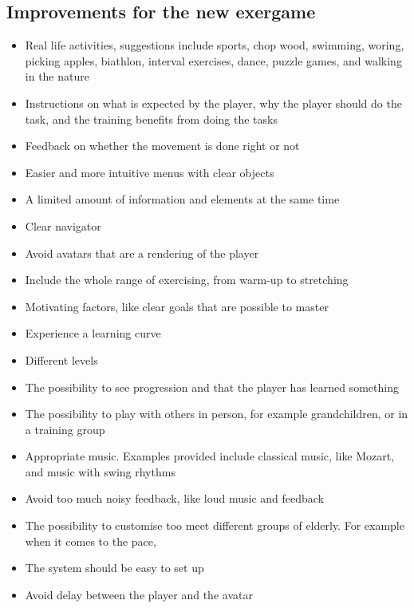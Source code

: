 \subsection{Improvements for the new exergame}
\begin{itemize}
\item Real life activities, suggestions include sports, chop wood, swimming, woring, picking apples, biathlon, interval exercises, dance, puzzle games, and walking in the nature
\item Instructions on what is expected by the player, why the player should do the task, and the training benefits from doing the tasks
\item Feedback on whether the movement is done right or not
\item Easier and more intuitive menus with clear objects
\item A limited amount of information and elements at the same time
\item Clear navigator
\item Avoid avatars that are a rendering of the player
\item Include the whole range of exercising, from warm-up to stretching
\item Motivating factors, like clear goals that are possible to master
\item Experience a learning curve
\item Different levels
\item The possibility to see progression and that the player has learned something
\item The possibility to play with others in person, for example grandchildren, or in a training group
\item Appropriate music. Examples provided include classical music, like Mozart, and music with swing rhythms
\item Avoid too much noisy feedback, like loud music and feedback
\item The possibility to customise too meet different groups of elderly. For example when it comes to the pace,
\item The system should be easy to set up
\item Avoid delay between the player and the avatar
\end{itemize}







